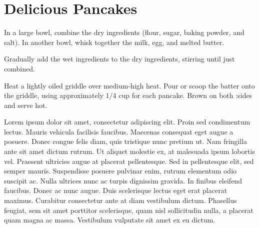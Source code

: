 \chapter{Delicious Pancakes}



In a large bowl, combine the dry ingredients (flour, sugar, baking powder, and salt). In another bowl, whisk together the milk, egg, and melted butter.

Gradually add the wet ingredients to the dry ingredients, stirring until just combined.

Heat a lightly oiled griddle over medium-high heat. Pour or scoop the batter onto the griddle, using approximately 1/4 cup for each pancake. Brown on both :sides and serve hot.

Lorem ipsum dolor sit amet, consectetur adipiscing elit. Proin sed condimentum lectus. Mauris vehicula facilisis faucibus. Maecenas consequat eget augue a posuere. Donec congue felis diam, quis tristique nunc pretium ut. Nam fringilla ante sit amet dictum rutrum. Ut aliquet molestie ex, at malesuada ipsum lobortis vel. Praesent ultricies augue at placerat pellentesque. Sed in pellentesque elit, sed semper mauris. Suspendisse posuere pulvinar enim, rutrum elementum odio suscipit ac. Nulla ultrices nunc ac turpis dignissim gravida. In finibus eleifend faucibus. Donec ac nunc augue. Duis scelerisque lectus eget erat placerat maximus. Curabitur consectetur ante at diam vestibulum dictum. Phasellus feugiat, sem sit amet porttitor scelerisque, quam nisl sollicitudin nulla, a placerat quam magna ac massa. Vestibulum vulputate sit amet ex eu dictum.


